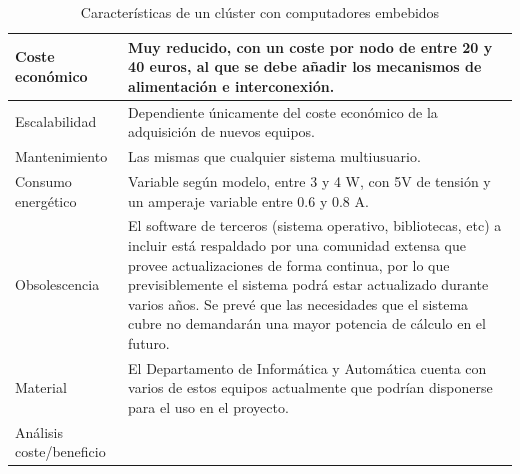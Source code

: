 \begin{table}[H]
\begin{tabular}{|p{2.4cm}|p{12cm}|}
\\
\hline
Coste económico&Muy reducido, con un coste por nodo de entre 20 y 40 euros, al que se debe añadir los mecanismos de alimentación e interconexión.\\
\hline
Escalabilidad&Dependiente únicamente del coste económico de la adquisición de nuevos equipos.\\
\hline
Mantenimiento&Las mismas que cualquier sistema multiusuario.\\
\hline
Consumo energético&Variable según modelo, entre 3 y 4 W, con 5V de tensión y un amperaje variable entre 0.6 y 0.8 A.\\
\hline
Obsolescencia&El software de terceros (sistema operativo, bibliotecas, etc) a incluir está respaldado por una comunidad extensa que provee actualizaciones de forma continua, por lo que previsiblemente el sistema podrá estar actualizado durante varios años.
Se prevé que las necesidades que el sistema cubre no demandarán una mayor potencia de cálculo en el futuro.\\
\hline
Material&El Departamento de Informática y Automática cuenta con varios de estos equipos actualmente que podrían disponerse para el uso en el proyecto.\\
\hline
Análisis coste/beneficio&\\
\hline
\end{tabular}
\caption{Características de un clúster con computadores embebidos}
\end{table}

